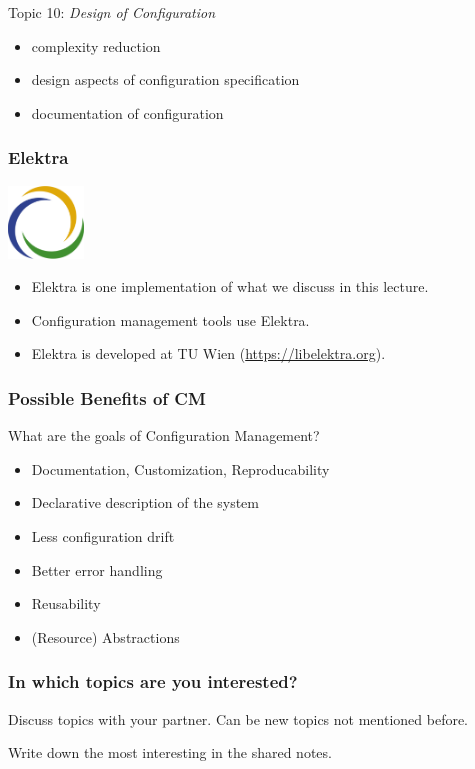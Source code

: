 \begin{frame}
	Topic 10: \textit{Design of Configuration}
	\begin{itemize}
		\item complexity reduction
		\item design aspects of configuration specification
		\item documentation of configuration
	\end{itemize}
\end{frame}


\begin{frame}
	\frametitle{Elektra}
	\hfill \includegraphics[width=2cm]{../figures/logo}
	\vspace{-1cm}
	\begin{itemize}
		\item Elektra is one implementation of what we discuss in this lecture.
		\item Configuration management tools use Elektra.
		\item Elektra is developed at TU Wien (\url{https://libelektra.org}).
	\end{itemize}
\end{frame}

\begin{frame}
	\frametitle{Possible Benefits of CM}

	\begin{task}
	What are the goals of Configuration Management?
	\end{task}

	\pause

	\begin{itemize} %
	\item Documentation, Customization, Reproducability
	\item Declarative description of the system
	\item Less configuration drift
	\item Better error handling
	\item Reusability
	\item (Resource) Abstractions
	\end{itemize}
\end{frame}

\begin{assignment}
	\frametitle{In which topics are you interested?}
	\begin{task}[1]
	Discuss topics with your partner.
	Can be new topics not mentioned before.
	\end{task}

	\begin{task}[2]
	Write down the most interesting in the shared notes.
	\end{task}
\end{assignment}





